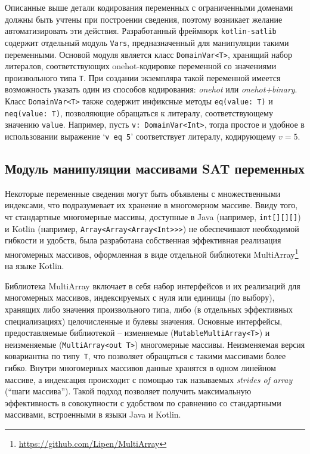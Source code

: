 Описанные выше детали кодирования переменных с ограниченными доменами должны быть учтены при построении сведения, поэтому возникает желание автоматизировать эти действия.
Разработанный фреймворк \texttt{kotlin-satlib} содержит отдельный модуль \texttt{Vars}, предназначенный для манипуляции такими переменными.
Основой модуля является класс \texttt{DomainVar<T>}, хранящий набор литералов, соответствующих onehot-кодировке переменной со значениями произвольного типа \texttt{T}.
При создании экземпляра такой переменной имеется возможность указать один из способов кодирования: \textit{onehot} или \textit{onehot+binary}.
Класс \texttt{DomainVar<T>} также содержит инфиксные методы \texttt{eq(value:~T)} и \texttt{neq(value:~T)}, позволяющие обращаться к литералу, соответствующему значению \texttt{value}.
Например, пусть \texttt{v:~DomainVar<Int>}, тогда простое и удобное в использовании выражение `\texttt{v~eq~5}' соответствует литералу, кодирующему $v = 5$.

\subsection{Модуль манипуляции массивами SAT переменных}

Некоторые переменные сведения могут быть объявлены с множественными индексами, что подразумевает их хранение в многомерном массиве. Ввиду того, чт стандартные многомерные массивы, доступные в Java (например, \texttt{int[][][]}) и Kotlin (например, \texttt{Array<Array<Array<Int>>>}) не обеспечивают необходимой гибкости и удобств, была разработана собственная эффективная реализация многомерных массивов, оформленная в виде отдельной библиотеки MultiArray\footnote{\url{https://github.com/Lipen/MultiArray}} на языке Kotlin.

Библиотека MultiArray включает в себя набор интерфейсов и их реализаций для многомерных массивов, индексируемых с нуля или единицы (по выбору), хранящих либо значения произвольного типа, либо (в отдельных эффективных специализациях) целочисленные и булевы значения.
Основные интерфейсы, предоставляемые библиотекой \--- изменяемые (\texttt{Mutable\-Multi\-Array<T>}) и неизменяемые (\texttt{Multi\-Array<out~T>}) многомерные массивы.
Неизменяемая версия ковариантна по типу~\texttt{T}, что позволяет обращаться с такими массивами более гибко.
Внутри многомерных массивов данные хранятся в одном линейном массиве, а индексация происходит с помощью так называемых \textit{strides of array} (\enquote{шаги массива}).
Такой подход позволяет получить максимальную эффективность в совокупности с удобством по сравнению со стандартными массивами, встроенными в языки Java и Kotlin.


